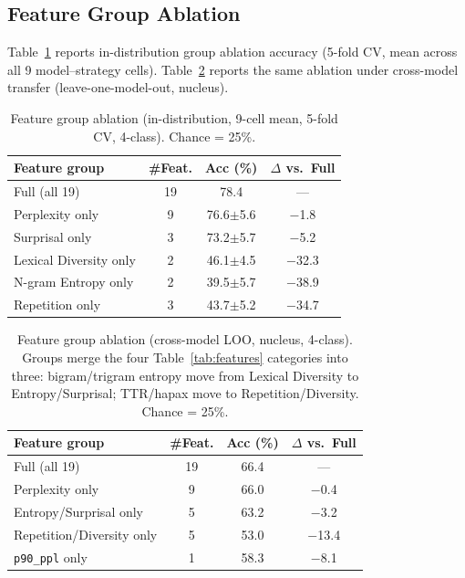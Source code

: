 \subsection{Feature Group Ablation}
\label{app:feature_ablation}

Table~\ref{tab:feature_ablation_indist} reports in-distribution group ablation accuracy (5-fold CV, mean across all 9 model--strategy cells).
Table~\ref{tab:feature_ablation} reports the same ablation under cross-model transfer (leave-one-model-out, nucleus).

\begin{table}[h]
\centering
\small
\caption{Feature group ablation (in-distribution, 9-cell mean, 5-fold CV, 4-class). Chance = 25\%.}
\label{tab:feature_ablation_indist}
\begin{tabular}{@{}lccc@{}}
\toprule
Feature group & \#Feat. & Acc (\%) & $\Delta$ vs.\ Full \\
\midrule
Full (all 19) & 19 & 78.4 & --- \\
Perplexity only & 9 & 76.6{\scriptsize$\pm$5.6} & $-$1.8 \\
Surprisal only & 3 & 73.2{\scriptsize$\pm$5.7} & $-$5.2 \\
Lexical Diversity only & 2 & 46.1{\scriptsize$\pm$4.5} & $-$32.3 \\
N-gram Entropy only & 2 & 39.5{\scriptsize$\pm$5.7} & $-$38.9 \\
Repetition only & 3 & 43.7{\scriptsize$\pm$5.2} & $-$34.7 \\
\bottomrule
\end{tabular}
\end{table}

\begin{table}[h]
\centering
\small
\caption{Feature group ablation (cross-model LOO, nucleus, 4-class). Groups merge the four Table~\ref{tab:features} categories into three: bigram/trigram entropy move from Lexical Diversity to Entropy/Surprisal; TTR/hapax move to Repetition/Diversity. Chance = 25\%.}
\label{tab:feature_ablation}
\begin{tabular}{@{}lccc@{}}
\toprule
Feature group & \#Feat. & Acc (\%) & $\Delta$ vs.\ Full \\
\midrule
Full (all 19) & 19 & 66.4 & --- \\
Perplexity only & 9 & 66.0 & $-$0.4 \\
Entropy/Surprisal only & 5 & 63.2 & $-$3.2 \\
Repetition/Diversity only & 5 & 53.0 & $-$13.4 \\
\midrule
\texttt{p90\_ppl} only & 1 & 58.3 & $-$8.1 \\
\bottomrule
\end{tabular}
\end{table}

